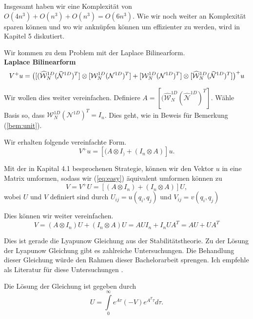 Insgesamt haben wir eine Komplexität von $O(4n^3)+O(n^3)+O(n^3)=O(6n^3)$.
Wie wir noch weiter an Komplexität sparen können und wo wir anknüpfen können um effizienter zu werden, wird in Kapitel 5 diskutiert.

Wir kommen zu dem Problem mit der Laplace Bilinearform.  \\
\textbf{Laplace Bilinearform}
\begin{equation*}
V^{+}u = \big{(} [(\widehat{\mathcal{W}}_N^{1D} (\widehat{\mathcal{N}}^{1D})^T] \otimes [\mathcal{W}_N^{1D} (\mathcal{N}^{1D})^T]  +  [\mathcal{W}_N^{1D} (\mathcal{N}^{1D})^T] \otimes [\widehat{\mathcal{W}}_N^{1D} (\widehat{\mathcal{N}}^{1D})^T]  \big{)}^+ u
\end{equation*}

Wir wollen dies weiter vereinfachen. Definiere $A=[(\widehat{\mathcal{W}}_N^{1D} (\widehat{\mathcal{N}}^{1D})^T]$. Wähle Basis so, dass $\mathcal{W}_N^{1D} (\mathcal{N}^{1D})^T  = I_n$. Dies geht, wie in Beweis für Bemerkung (\ref{bem:unit}).

Wir erhalten folgende vereinfachte Form.
\begin{equation*} \label{eq:easy}
V^{+}u =[(A \otimes I_) + (I_n \otimes A)]u.
\end{equation*}

Mit der in Kapital 4.1 besprochenen Strategie, können wir den Vektor $u$ in eine Matrix umformen, sodass wir (\ref{eq:easy}) äquivalent umformen können zu
\begin{equation*} \label{eq:easy}
V=V^{+}U =[(A \otimes I_n) + (I_n \otimes A)]U,
\end{equation*}
wobei $U$  und $V$ definiert sind durch $U_{ij}=u(q_i,q_j)$ und $V_{ij}=v(q_i,q_j)$

Dies können wir weiter vereinfachen.
\begin{equation*} \label{eq:easy}
V=(A \otimes I_n)U + (I_n \otimes A)U = AUI_n + I_n U A^T = AU + UA^T
\end{equation*}

Dies ist gerade die Lyapunow Gleichung aus der Stabilitätstheorie. Zu der Lösung der Lyapunow Gleichung gibt es zahlreiche Untersuchungen. Die Behandlung dieser Gleichung würde den Rahmen dieser Bachelorarbeit sprengen. Ich empfehle als Literatur für diese Untersuchungen \cite{Lyapunov}.

Die Lösung der Gleichung ist gegeben durch
\begin{equation*}
U = \int\limits_{0}^{\infty} e^{A \tau} (-V) e^{A^T \tau} d\tau.
\end{equation*}

